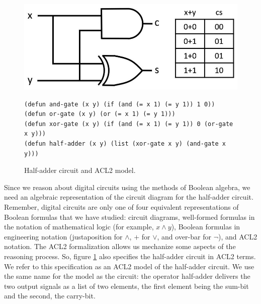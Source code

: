 \begin{figure}
\begin{center}
\includegraphics[scale=1]{images-cmyk/half-adder}
\begin{code}
\begin{verbatim}
(defun and-gate (x y) (if (and (= x 1) (= y 1)) 1 0))
(defun or-gate (x y) (or (= x 1) (= y 1)))
(defun xor-gate (x y) (if (and (= x 1) (= y 1)) 0 (or-gate x y)))
(defun half-adder (x y) (list (xor-gate x y) (and-gate x y)))
\end{verbatim}
\end{code}
\end{center}
\caption{Half-adder circuit and ACL2 model.}
\label{fig:half-adder}
\end{figure}

Since we reason about digital circuits using the methods
of Boolean algebra, we need an algebraic representation
of the circuit diagram for the half-adder circuit.
Remember, digital circuits are only one of four
equivalent representations of Boolean formulas that
we have studied: circuit diagrams, well-formed formulas
in the notation of mathematical logic (for example, $x \wedge y$),
Boolean formulas in engineering notation (justaposition for $\wedge$,
$+$ for $\vee$, and over-bar for $\neg$), and ACL2 notation.
The ACL2 formalization allows us mechanize some aspects of the reasoning process.
So, figure \ref{fig:half-adder} also specifies the half-adder circuit in ACL2 terms.
We refer to this specification as an
ACL2 model of the half-adder circuit.
We use the same name for the model as the circuit:
the operator \textsf{half-adder}
delivers the two output signals as a list of two elements,
the first element being the sum-bit and the second, the carry-bit.

